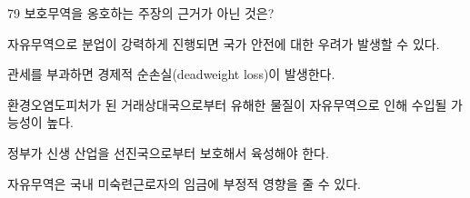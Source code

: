 \begin{question}{79}
보호무역을 옹호하는 주장의 근거가 아닌 것은?
\begin{choices}
  \item 자유무역으로 분업이 강력하게 진행되면 국가 안전에 대한 우려가 발생할 수 있다.
  \item 관세를 부과하면 경제적 순손실(deadweight loss)이 발생한다.
  \item 환경오염도피처가 된 거래상대국으로부터 유해한 물질이 자유무역으로 인해 수입될 가능성이 높다.
  \item 정부가 신생 산업을 선진국으로부터 보호해서 육성해야 한다.
  \item 자유무역은 국내 미숙련근로자의 임금에 부정적 영향을 줄 수 있다.
\end{choices}
\end{question}
